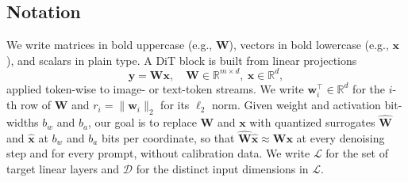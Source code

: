 \subsection{Notation}
\label{sec:prelim:notation}
\vspace{-0.9mm}
We write matrices in bold uppercase (e.g., $\mathbf{W}$), vectors in bold lowercase (e.g., $\mathbf{x}$), and scalars in plain type. A DiT block is built from linear projections
\begin{equation}
\mathbf{y} = \mathbf{W}\mathbf{x}, \quad \mathbf{W} \in \mathbb{R}^{m \times d},\ \mathbf{x} \in \mathbb{R}^d,
\label{eq:linear}
\end{equation}
applied token-wise to image- or text-token streams. We write $\mathbf{w}_i^\top \in \mathbb{R}^d$ for the $i$-th row of $\mathbf{W}$ and $r_i = \|\mathbf{w}_i\|_2$ for its $\ell_2$ norm. Given weight and activation bit-widths $b_w$ and $b_a$, our goal is to replace $\mathbf{W}$ and $\mathbf{x}$ with quantized surrogates $\hat{\mathbf{W}}$ and $\hat{\mathbf{x}}$ at $b_w$ and $b_a$ bits per coordinate, so that $\hat{\mathbf{W}}\hat{\mathbf{x}} \approx \mathbf{W}\mathbf{x}$ at every denoising step and for every prompt, without calibration data. We write $\mathcal{L}$ for the set of target linear layers and $\mathcal{D}$ for the distinct input dimensions in $\mathcal{L}$.


